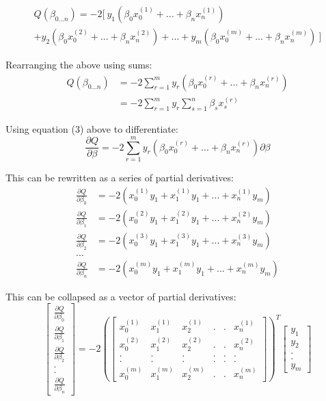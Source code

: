\documentclass{article}
\begin{document}
	\begin{multline*}
	Q(\beta_{0...n})=-2[\:y_1(\beta_0x^{(1)}_0+...+\beta_nx^{(1)}_n)\\
	+y_2(\beta_0x^{(2)}_0+...+\beta_nx^{(2)}_n)+...+y_m(\beta_0x^{(m)}_0+...+\beta_nx^{(m)}_n)\:]
	\end{multline*}
	
	Rearranging the above using sums:	
	\begin{align}
	Q(\beta_{0...n})&=-2\sum_{r=1}^{m}y_r(\beta_0x_0^{(r)}+...+\beta_nx^{(r)}_n)\\
	&=-2\sum_{r=1}^{m}y_r\sum_{s=1}^{n}\beta_sx_s^{(r)}
	\end{align}
	
	Using equation (3) above to differentiate:	
	\begin{equation*}
	\frac{\partial Q}{\partial \beta}=-2\sum_{r=1}^{m}y_r(\beta_0x_0^{(r)}+...+\beta_nx^{(r)}_n) \partial \beta
	\end{equation*}
	
	This can be rewritten as a series of partial derivatives:
	\begin{align*}
	\frac{\partial Q}{\partial \beta_0}&=-2(x_0^{(1)}y_1+x_1^{(1)}y_1+...+x_n^{(1)}y_m)\\
	\frac{\partial Q}{\partial \beta_1}&=-2(x_0^{(2)}y_1+x_1^{(2)}y_1+...+x_n^{(2)}y_m)\\
	\frac{\partial Q}{\partial \beta_2}&=-2(x_0^{(3)}y_1+x_1^{(3)}y_1+...+x_n^{(3)}y_m)\\
	...\\
	\frac{\partial Q}{\partial \beta_n}&=-2(x_0^{(m)}y_1+x_1^{(m)}y_1+...+x_n^{(m)}y_m)
	\end{align*}
	
	This can be collapsed as a vector of partial derivatives:
	\begin{equation*}
	\begin{bmatrix}
		\frac{\partial Q}{\partial \beta_0}\\
		\frac{\partial Q}{\partial \beta_1}\\
		\frac{\partial Q}{\partial \beta_2}\\
		.\\
		.\\
		\frac{\partial Q}{\partial \beta_n}
	\end{bmatrix}=-2\left(\begin{bmatrix}
	x_0^{(1)}&x_1^{(1)}&x_2^{(1)}&.&.&x_n^{(1)}\\
	x_0^{(2)}&x_1^{(2)}&x_2^{(2)}&.&.&x_n^{(2)}\\
	.&.&.&.&.&.\\
	.&.&.&.&.&.\\
	x_0^{(m)}&x_1^{(m)}&x_2^{(m)}&.&.&x_n^{(m)}
	\end{bmatrix}\right)^T\begin{bmatrix}
	y_1\\
	y_2\\
	.\\
	.\\
	y_m
	\end{bmatrix}
	\end{equation*}
	
\end{document}
